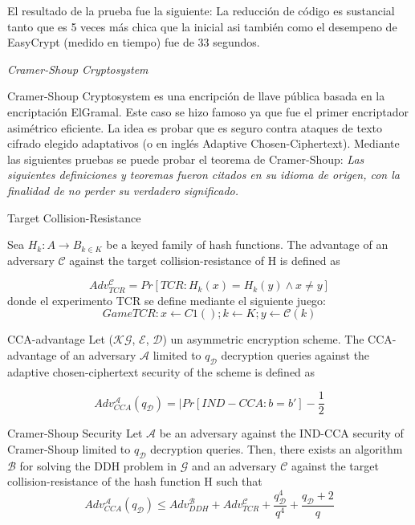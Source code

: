 \documentclass[runningheads,a4paper]{llncs}
\begin{document}
El resultado de la prueba fue la siguiente: La reducción de código es sustancial tanto que es 5 veces más chica que la inicial asi también como el desempeno de EasyCrypt (medido en tiempo) fue de 33 segundos.\cite{article3}




\centerline{\emph{Cramer-Shoup Cryptosystem}}

Cramer-Shoup Cryptosystem es una encripción de llave pública basada en la encriptación ElGramal. Este caso se hizo famoso ya que fue el primer encriptador asimétrico eficiente. La idea es probar que es seguro contra ataques de texto cifrado elegido adaptativos (o en inglés Adaptive Chosen-Ciphertext).
Mediante las siguientes pruebas se puede probar el teorema de Cramer-Shoup:
\emph{Las siguientes definiciones y teoremas fueron citados en su idioma de origen, con la finalidad de no perder su verdadero significado.}
\begin{definition}{Target Collision-Resistance}

Sea $H_k : A \rightarrow B_{k∈K}$ be a keyed family of hash
functions. The advantage of an adversary $\mathcal{C}$ against the target collision-resistance of H is defined as

	\[Adv_{TCR}^\mathcal{C} = Pr[TCR:H_k(x) = H_k (y) \land x \neq y]\]
	donde el experimento TCR se define mediante el siguiente juego:
	\[Game TCR : x \leftarrow C 1 ( ); k \leftarrow K; y \leftarrow \mathcal{C}(k)\]
\end{definition}

\begin{definition}{CCA-advantage}
Let ($\mathcal{K}\mathcal{G}$, $\mathcal{E}$, $\mathcal{D}$) un asymmetric encryption scheme. The CCA-advantage of an adversary $\mathcal{A}$ limited to $q_\mathcal{D}$ decryption queries against the adaptive chosen-ciphertext security of the scheme is defined as

\[Adv_{CCA}^\mathcal{A} (q_\mathcal{D})= |Pr[IND-CCA: b=b'] - \frac{1}{2}\]
\end{definition}

\begin{theorem}{Cramer-Shoup Security}
Let $\mathcal{A}$ be an adversary against the IND-CCA security
of Cramer-Shoup limited to $q_\mathcal{D}$ decryption queries. Then, there exists an algorithm $\mathcal{B}$ for solving the
DDH problem in $\mathcal{G}$ and an adversary $\mathcal{C}$ against the target collision-resistance of the hash function H
such that
\[Adv_{CCA}^\mathcal{A}(q_\mathcal{D}) \leq Adv_{DDH}^\mathcal{B} + Adv_{TCR}^\mathcal{C} + \frac{q_\mathcal{D}^4}{q^4} + \frac{q_\mathcal{D} + 2}{q}\]
\end{theorem}
\end{document}
